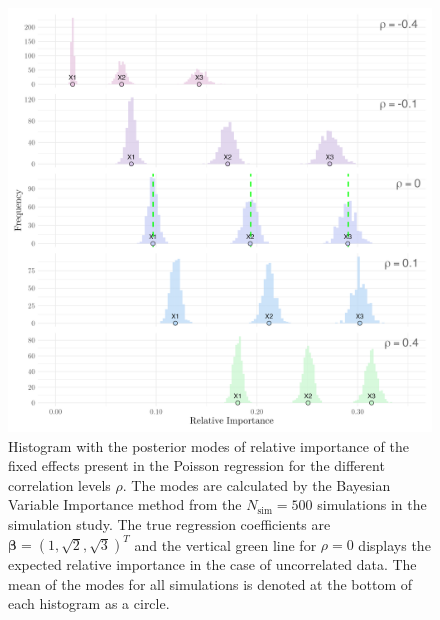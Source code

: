 \begin{figure}[H]
  \centering
  \includegraphics[width=1\linewidth]{Figures/Simulation study/Fixed_combined_poisson.png}
  \caption[Relative importance of the fixed effects in Poisson GLMM]{Histogram with the posterior modes of relative importance of the fixed effects present in the Poisson regression for the different correlation levels $\rho$. The modes are calculated by the Bayesian Variable Importance method from the $N_{\text{sim}}=500$ simulations in the simulation study. The true regression coefficients are $\boldsymbol{\beta}=(1, \sqrt{2}, \sqrt{3})^T$ and the vertical green line for $\rho=0$ displays the expected relative importance in the case of uncorrelated data. The mean of the modes for all simulations is denoted at the bottom of each histogram as a circle.}
  \label{fig:fixed_combined_poisson}
\end{figure}
